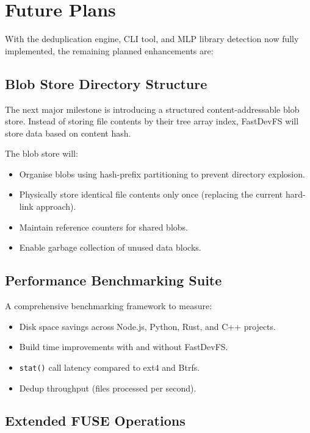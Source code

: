 \documentclass[12pt, a4paper]{article}
\begin{document}
\section{Future Plans}

With the deduplication engine, CLI tool, and MLP library detection now fully implemented, the remaining planned enhancements are:

\subsection{Blob Store Directory Structure}

The next major milestone is introducing a structured content-addressable blob store. Instead of storing file contents by their tree array index, FastDevFS will store data based on content hash.

The blob store will:
\begin{itemize}
  \item Organise blobs using hash-prefix partitioning to prevent directory explosion.
  \item Physically store identical file contents only once (replacing the current hard-link approach).
  \item Maintain reference counters for shared blobs.
  \item Enable garbage collection of unused data blocks.
\end{itemize}

\subsection{Performance Benchmarking Suite}

A comprehensive benchmarking framework to measure:
\begin{itemize}
  \item Disk space savings across Node.js, Python, Rust, and C++ projects.
  \item Build time improvements with and without FastDevFS.
  \item \texttt{stat()} call latency compared to ext4 and Btrfs.
  \item Dedup throughput (files processed per second).
\end{itemize}

\subsection{Extended FUSE Operations}
\end{document}

